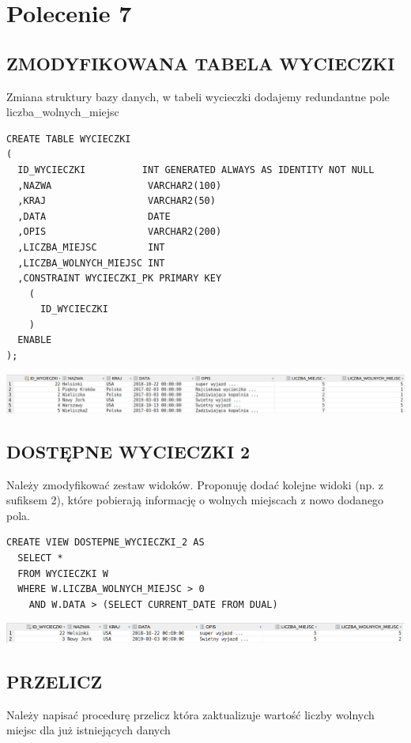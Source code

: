 \newpage
\section{Polecenie 7}

\subsection{ZMODYFIKOWANA TABELA WYCIECZKI}
Zmiana struktury bazy danych, w tabeli wycieczki dodajemy redundantne pole
liczba\_wolnych\_miejsc

\begin{verbatim}
CREATE TABLE WYCIECZKI
(
  ID_WYCIECZKI          INT GENERATED ALWAYS AS IDENTITY NOT NULL
  ,NAZWA                 VARCHAR2(100)
  ,KRAJ                  VARCHAR2(50)
  ,DATA                  DATE
  ,OPIS                  VARCHAR2(200)
  ,LICZBA_MIEJSC         INT
  ,LICZBA_WOLNYCH_MIEJSC INT
  ,CONSTRAINT WYCIECZKI_PK PRIMARY KEY
    (
      ID_WYCIECZKI
    )
  ENABLE
);
\end{verbatim}

\includegraphics[width=\linewidth]{./images/zmodyfikowana_tabela_wycieczki.png}

\subsection{DOSTĘPNE WYCIECZKI 2}
Należy zmodyfikować zestaw widoków. Proponuję dodać kolejne widoki (np. z sufiksem 2), które
pobierają informację o wolnych miejscach z nowo dodanego pola.

\begin{verbatim}
CREATE VIEW DOSTEPNE_WYCIECZKI_2 AS
  SELECT *
  FROM WYCIECZKI W
  WHERE W.LICZBA_WOLNYCH_MIEJSC > 0
    AND W.DATA > (SELECT CURRENT_DATE FROM DUAL)
\end{verbatim}

\includegraphics[width=\linewidth]{./images/dostepne_wycieczki_2.png}

\subsection{PRZELICZ}
Należy napisać procedurę przelicz która zaktualizuje wartość liczby wolnych miejsc dla już
istniejących danych

